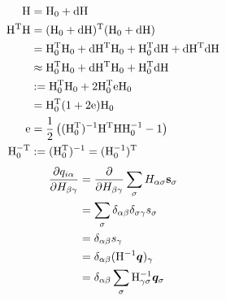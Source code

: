 \documentclass[11pt,a4paper,uplatex]{jsarticle}
\begin{document}
\begin{align}
    {\rm H} &= {\rm H_{0} + dH} \\
    {\rm H^{T} H} &= {\rm (H_{0} + dH)^{T} (H_{0} + dH)} \\
    &= {\rm H_{0}^{T} H_{0} + dH^{T} H_{0} + H_{0}^{T}dH + dH^{T}dH} \\
    &\approx {\rm H_{0}^{T} H_{0} + dH^{T} H_{0} + H_{0}^{T}dH } \\
    &:= {\rm H_{0}^{T} H_{0} + 2 H_{0}^{T} e H_{0}} \\
    &= {\rm H_{0}^T (1 + 2 e) H_{0}} \\
{\rm e} &= {\rm \frac{1}{2}\left((H_{0}^{T})^{-1} H^{T} H H_{0}^{-1} - 1 \right) } \\
{\rm H_{0}^{-T} } &:= {\rm (H_{0}^{T})^{-1}} = {\rm (H_{0}^{-1})^{T} }
\end{align}
\begin{align}
    \frac{\partial q_{i \alpha}}{\partial H_{\beta \gamma}} 
    &= \frac{\partial}{\partial H_{\beta \gamma}} \sum_{\sigma} H_{\alpha \sigma} \bf{s}_{\sigma} \\
    &= \sum_{\sigma} \delta_{\alpha \beta} \delta_{\sigma \gamma} s_{\sigma} \\
    &= \delta_{\alpha \beta} s_{\gamma} \\
    &= \delta_{\alpha \beta} ({\rm H}^{-1} \bm{q})_{\gamma} \\
    &= \delta_{\alpha \beta} \sum_{\sigma} {\rm H}^{-1}_{\gamma \sigma} \bm{q}_{\sigma}
\end{align}
\end{document}
